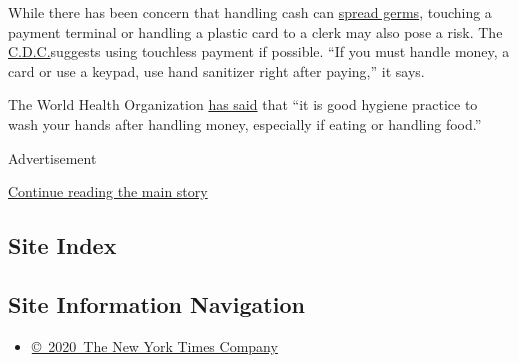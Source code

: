 While there has been concern that handling cash can
\href{https://apnews.com/7f96f57e3c327e7dbe2be79f2bbdd543}{spread
germs}, touching a payment terminal or handling a plastic card to a
clerk may also pose a risk. The
\href{https://www.cdc.gov/coronavirus/2019-ncov/daily-life-coping/essential-goods-services.html}{C.D.C.}suggests
using touchless payment if possible. ``If you must handle money, a card
or use a keypad, use hand sanitizer right after paying,'' it says.

The World Health Organization
\href{https://www.nytimes3xbfgragh.onion/2020/03/27/learning/what-questions-do-you-have-about-the-coronavirus.html}{has
said} that ``it is good hygiene practice to wash your hands after
handling money, especially if eating or handling food.''

Advertisement

\protect\hyperlink{after-bottom}{Continue reading the main story}

\hypertarget{site-index}{%
\subsection{Site Index}\label{site-index}}

\hypertarget{site-information-navigation}{%
\subsection{Site Information
Navigation}\label{site-information-navigation}}

\begin{itemize}
\tightlist
\item
  \href{https://help.nytimes3xbfgragh.onion/hc/en-us/articles/115014792127-Copyright-notice}{©~2020~The
  New York Times Company}
\end{itemize}

